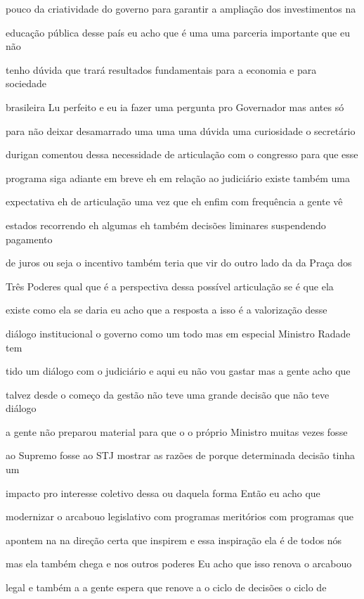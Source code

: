 \documentclass[a4paper,12pt]{article}
\begin{document}
pouco da criatividade do governo para garantir a ampliação dos investimentos na

educação pública desse país eu acho que é uma uma parceria importante que eu não

tenho dúvida que trará resultados fundamentais para a economia e para sociedade

brasileira Lu perfeito e eu ia fazer uma pergunta pro Governador mas antes só

para não deixar desamarrado uma uma uma dúvida uma curiosidade o secretário

durigan comentou dessa necessidade de articulação com o congresso para que esse

programa siga adiante em breve eh em relação ao judiciário existe também uma

expectativa eh de articulação uma vez que eh enfim com frequência a gente vê

estados recorrendo eh algumas eh também decisões liminares suspendendo pagamento

de juros ou seja o incentivo também teria que vir do outro lado da da Praça dos

Três Poderes qual que é a perspectiva dessa possível articulação se é que ela

existe como ela se daria eu acho que a resposta a isso é a valorização desse

diálogo institucional o governo como um todo mas em especial Ministro Radade tem

tido um diálogo com o judiciário e aqui eu não vou gastar mas a gente acho que

talvez desde o começo da gestão não teve uma grande decisão que não teve diálogo

a gente não preparou material para que o o próprio Ministro muitas vezes fosse

ao Supremo fosse ao STJ mostrar as razões de porque determinada decisão tinha um

impacto pro interesse coletivo dessa ou daquela forma Então eu acho que

modernizar o arcabouo legislativo com programas meritórios com programas que

apontem na na direção certa que inspirem e essa inspiração ela é de todos nós

mas ela também chega e nos outros poderes Eu acho que isso renova o arcabouo

legal e também a a gente espera que renove a o ciclo de decisões o ciclo de
\end{document}
